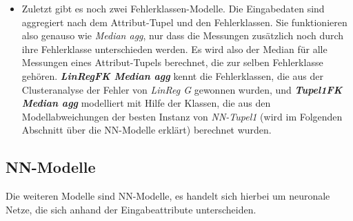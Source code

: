 \documentclass[
	twoside,
	12pt,
	a4paper,
	BCOR10mm,
	DIV14,
	listof=totoc,
	bibliography=totoc,
	headsepline
]{scrreprt}
\begin{document}
\begin{itemize}
	\item Zuletzt gibt es noch zwei Fehlerklassen-Modelle. Die Eingabedaten sind aggregiert nach dem Attribut-Tupel und den Fehlerklassen. 
Sie funktionieren also genauso wie \textit{Median agg}, nur dass die Messungen zusätzlich noch durch ihre Fehlerklasse unterschieden werden. Es wird also der Median für alle Messungen eines Attribut-Tupels berechnet, die zur selben Fehlerklasse gehören.
\textit{\textbf{LinRegFK Median agg}} kennt die Fehlerklassen, die aus der Clusteranalyse der Fehler von \textit{LinReg G} gewonnen wurden, und \textit{\textbf{Tupel1FK Median agg}} modelliert mit Hilfe der Klassen, die aus den Modellabweichungen der besten Instanz von \textit{NN-Tupel1} (wird im Folgenden Abschnitt über die NN-Modelle erklärt) berechnet wurden.
\end{itemize}

\subsection{NN-Modelle}
Die weiteren Modelle sind NN-Modelle, es handelt sich hierbei um neuronale Netze, die sich anhand der Eingabeattribute unterscheiden.
\end{document}

